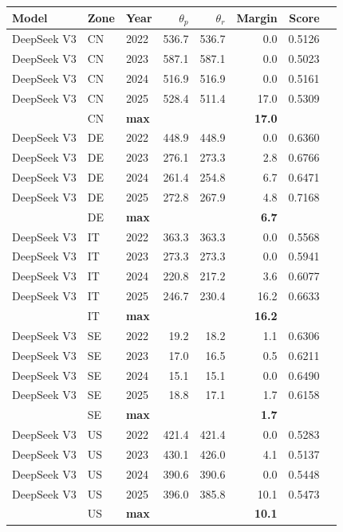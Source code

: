 \begin{tabular}{lllrrrrr}
\toprule
Model & Zone & Year & $\theta_p$ & $\theta_r$ & Margin & Score \\
\midrule
DeepSeek V3 & CN & 2022 & 536.7 & 536.7 & 0.0 & 0.5126 \\
DeepSeek V3 & CN & 2023 & 587.1 & 587.1 & 0.0 & 0.5023 \\
DeepSeek V3 & CN & 2024 & 516.9 & 516.9 & 0.0 & 0.5161 \\
DeepSeek V3 & CN & 2025 & 528.4 & 511.4 & 17.0 & 0.5309 \\
 & CN & \textbf{max} & & & \textbf{17.0} & \\
\midrule
DeepSeek V3 & DE & 2022 & 448.9 & 448.9 & 0.0 & 0.6360 \\
DeepSeek V3 & DE & 2023 & 276.1 & 273.3 & 2.8 & 0.6766 \\
DeepSeek V3 & DE & 2024 & 261.4 & 254.8 & 6.7 & 0.6471 \\
DeepSeek V3 & DE & 2025 & 272.8 & 267.9 & 4.8 & 0.7168 \\
 & DE & \textbf{max} & & & \textbf{6.7} & \\
\midrule
DeepSeek V3 & IT & 2022 & 363.3 & 363.3 & 0.0 & 0.5568 \\
DeepSeek V3 & IT & 2023 & 273.3 & 273.3 & 0.0 & 0.5941 \\
DeepSeek V3 & IT & 2024 & 220.8 & 217.2 & 3.6 & 0.6077 \\
DeepSeek V3 & IT & 2025 & 246.7 & 230.4 & 16.2 & 0.6633 \\
 & IT & \textbf{max} & & & \textbf{16.2} & \\
\midrule
DeepSeek V3 & SE & 2022 & 19.2 & 18.2 & 1.1 & 0.6306 \\
DeepSeek V3 & SE & 2023 & 17.0 & 16.5 & 0.5 & 0.6211 \\
DeepSeek V3 & SE & 2024 & 15.1 & 15.1 & 0.0 & 0.6490 \\
DeepSeek V3 & SE & 2025 & 18.8 & 17.1 & 1.7 & 0.6158 \\
 & SE & \textbf{max} & & & \textbf{1.7} & \\
\midrule
DeepSeek V3 & US & 2022 & 421.4 & 421.4 & 0.0 & 0.5283 \\
DeepSeek V3 & US & 2023 & 430.1 & 426.0 & 4.1 & 0.5137 \\
DeepSeek V3 & US & 2024 & 390.6 & 390.6 & 0.0 & 0.5448 \\
DeepSeek V3 & US & 2025 & 396.0 & 385.8 & 10.1 & 0.5473 \\
 & US & \textbf{max} & & & \textbf{10.1} & \\

\end{tabular}

